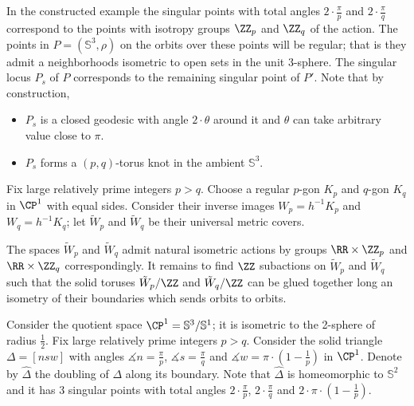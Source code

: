 In the constructed example 
the singular points with total angles $2\cdot\tfrac\pi p$ and
$2\cdot\tfrac\pi q$
correspond to the points with isotropy groups $\ZZ_p$ and $\ZZ_q$ of the action.
The points in $P=(\mathbb{S}^3,\rho)$ on the orbits over these points will be regular; that is they admit a neighborhoods isometric to open sets in the unit 3-sphere.
The singular locus $P_s$
of $P$ corresponds to the remaining singular point of $P'$.
Note that by construction,
\begin{itemize}
\item $P_s$ is a closed geodesic with angle $2\cdot\theta$ around it and $\theta$ can take arbitrary value close to $\pi$.
\item $P_s$ forms a $(p,q)$-torus knot in the ambient $\mathbb{S}^3$.
\end{itemize}
\qedsf






















Fix large relatively prime integers $p>q$.
Choose a regular $p$-gon $K_p$ and $q$-gon $K_q$ in $\CP^1$ with equal sides.
Consider their inverse images $W_p=h^{-1}K_p$ and $W_q=h^{-1}K_q$;
let $\tilde W_p$ and $\tilde W_q$ be their universal metric covers.

The spaces $\tilde W_p$ and $\tilde W_q$ admit natural isometric actions by groups $\RR\times\ZZ_p$ and $\RR\times\ZZ_q$ correspondingly.
It remains to find $\ZZ$ subactions on $\tilde W_p$ and $\tilde W_q$ such that the solid toruses $\tilde W_p/\ZZ$ and $\tilde W_q/\ZZ$ can be glued together long an isometry of their boundaries which sends orbits to orbits.

Consider the quotient space $\CP^1=\mathbb S^3/\mathbb S^1$;
it is isometric to the 2-sphere of radius $\tfrac12$.
Fix large relatively prime integers $p>q$. 
Consider the solid triangle $\Delta=[nsw]$ with angles $\measuredangle n=\tfrac\pi p$, $\measuredangle s=\tfrac\pi q$ and $\measuredangle w=\pi\cdot(1-\tfrac1 p)$ in $\CP^1$.
Denote by $\hat \Delta$ the  doubling of $\Delta$ along  its boundary.
Note that $\hat \Delta$ is homeomorphic to $\mathbb S^2$ and
it has 3 singular points with total angles $2\cdot\tfrac\pi p$,
$2\cdot\tfrac\pi q$ and $2\cdot\pi\cdot(1-\tfrac1 p)$.

